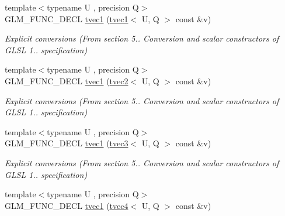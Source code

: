 \begin{DoxyCompactItemize}
\item 
\hypertarget{structglm_1_1detail_1_1tvec1_a2dd9171451398b559b398d6c540db4a7}{{\footnotesize template$<$typename U , precision Q$>$ }\\G\-L\-M\-\_\-\-F\-U\-N\-C\-\_\-\-D\-E\-C\-L \hyperlink{structglm_1_1detail_1_1tvec1_a2dd9171451398b559b398d6c540db4a7}{tvec1} (\hyperlink{structglm_1_1detail_1_1tvec1}{tvec1}$<$ U, Q $>$ const \&v)}\label{structglm_1_1detail_1_1tvec1_a2dd9171451398b559b398d6c540db4a7}

\begin{DoxyCompactList}\small\item\em Explicit conversions (From section 5.. Conversion and scalar constructors of G\-L\-S\-L 1.. specification) \end{DoxyCompactList}\item 
\hypertarget{structglm_1_1detail_1_1tvec1_a74bfab7db08f995b924a21fbf6e97158}{{\footnotesize template$<$typename U , precision Q$>$ }\\G\-L\-M\-\_\-\-F\-U\-N\-C\-\_\-\-D\-E\-C\-L \hyperlink{structglm_1_1detail_1_1tvec1_a74bfab7db08f995b924a21fbf6e97158}{tvec1} (\hyperlink{structglm_1_1detail_1_1tvec2}{tvec2}$<$ U, Q $>$ const \&v)}\label{structglm_1_1detail_1_1tvec1_a74bfab7db08f995b924a21fbf6e97158}

\begin{DoxyCompactList}\small\item\em Explicit conversions (From section 5.. Conversion and scalar constructors of G\-L\-S\-L 1.. specification) \end{DoxyCompactList}\item 
\hypertarget{structglm_1_1detail_1_1tvec1_a553b324447da4de7c371c3d109317905}{{\footnotesize template$<$typename U , precision Q$>$ }\\G\-L\-M\-\_\-\-F\-U\-N\-C\-\_\-\-D\-E\-C\-L \hyperlink{structglm_1_1detail_1_1tvec1_a553b324447da4de7c371c3d109317905}{tvec1} (\hyperlink{structglm_1_1detail_1_1tvec3}{tvec3}$<$ U, Q $>$ const \&v)}\label{structglm_1_1detail_1_1tvec1_a553b324447da4de7c371c3d109317905}

\begin{DoxyCompactList}\small\item\em Explicit conversions (From section 5.. Conversion and scalar constructors of G\-L\-S\-L 1.. specification) \end{DoxyCompactList}\item 
\hypertarget{structglm_1_1detail_1_1tvec1_afa1ae0c07774e38092fc7c016ab28a58}{{\footnotesize template$<$typename U , precision Q$>$ }\\G\-L\-M\-\_\-\-F\-U\-N\-C\-\_\-\-D\-E\-C\-L \hyperlink{structglm_1_1detail_1_1tvec1_afa1ae0c07774e38092fc7c016ab28a58}{tvec1} (\hyperlink{structglm_1_1detail_1_1tvec4}{tvec4}$<$ U, Q $>$ const \&v)}\label{structglm_1_1detail_1_1tvec1_afa1ae0c07774e38092fc7c016ab28a58}


\end{DoxyCompactItemize}
